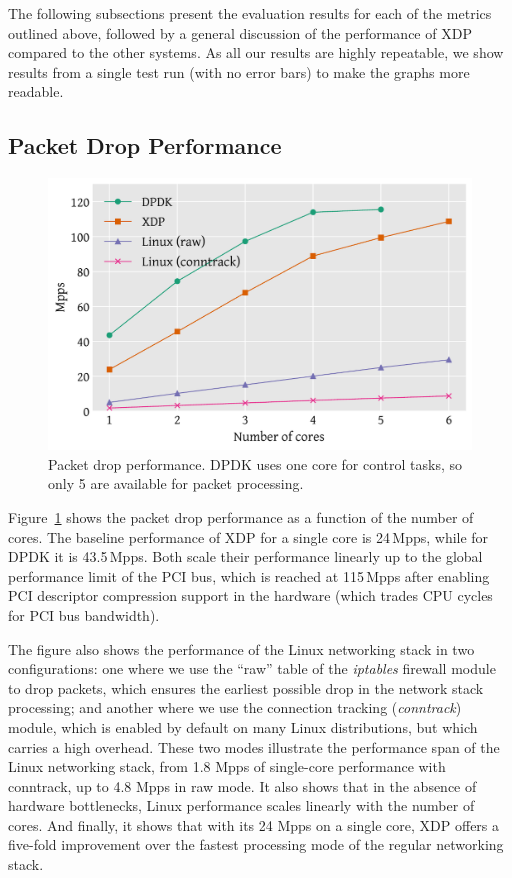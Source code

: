 \documentclass[sigconf]{acmart}
\begin{document}
The following subsections present the evaluation results for each of the metrics
outlined above, followed by a general discussion of the performance of XDP
compared to the other systems. As all our results are highly repeatable, we show
results from a single test run (with no error bars) to make the graphs more
readable.

\subsection{Packet Drop Performance}
\label{sec:basel-pack-proc}

\begin{figure}[t]
\centering
\includegraphics[width=\linewidth]{figures/drop-test.pdf}
\caption{\label{fig:drop-test} Packet drop performance. DPDK uses one core for
  control tasks, so only 5 are available for packet processing.}
\end{figure}

Figure~\ref{fig:drop-test} shows the packet drop performance as a function of
the number of cores. The baseline performance of XDP for a single core is
24\,Mpps, while for DPDK it is 43.5\,Mpps. Both scale their performance linearly
up to the global performance limit of the PCI bus, which is reached at 115\,Mpps
after enabling PCI descriptor compression support in the hardware (which trades
CPU cycles for PCI bus bandwidth).


The figure also shows the performance of the Linux networking stack in two
configurations: one where we use the ``raw'' table of the \emph{iptables}
firewall module to drop packets, which ensures the earliest possible drop in the
network stack processing; and another where we use the connection tracking
(\emph{conntrack}) module, which is enabled by default on many Linux
distributions, but which carries a high overhead. These two modes illustrate the
performance span of the Linux networking stack, from 1.8 Mpps of single-core
performance with conntrack, up to 4.8 Mpps in raw mode. It also shows that in
the absence of hardware bottlenecks, Linux performance scales linearly with the
number of cores. And finally, it shows that with its 24 Mpps on a single core,
XDP offers a five-fold improvement over the fastest processing mode of the
regular networking stack.
\end{document}
